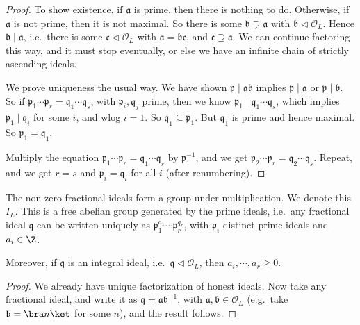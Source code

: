 \documentclass[a4paper]{article}
\begin{document}
\begin{proof}
  To show existence, if $\mathfrak{a}$ is prime, then there is nothing to do. Otherwise, if $\mathfrak{a}$ is not prime, then it is not maximal. So there is some $\mathfrak{b} \supsetneq \mathfrak{a}$ with $\mathfrak{b} \lhd \mathcal{O}_L$. Hence $\mathfrak{b} \mid \mathfrak{a}$, i.e.\ there is some $\mathfrak{c} \lhd \mathcal{O}_L$ with $\mathfrak{a} = \mathfrak{b} \mathfrak{c}$, and $\mathfrak{c} \supseteq \mathfrak{a}$. We can continue factoring this way, and it must stop eventually, or else we have an infinite chain of strictly ascending ideals.

  We prove uniqueness the usual way. We have shown $\mathfrak{p} \mid \mathfrak{a}\mathfrak{b}$ implies $\mathfrak{p} \mid \mathfrak{a}$ or $\mathfrak{p} \mid \mathfrak{b}$. So if $\mathfrak{p}_1 \cdots \mathfrak{p}_r = \mathfrak{q}_1 \cdots \mathfrak{q}_s$, with $\mathfrak{p}_i, \mathfrak{q}_j$ prime, then we know $\mathfrak{p}_1 \mid \mathfrak{q}_1 \cdots \mathfrak{q}_s$, which implies $\mathfrak{p}_1 \mid \mathfrak{q}_i$ for some $i$, and wlog $i = 1$. So $\mathfrak{q}_1 \subseteq \mathfrak{p}_1$. But $\mathfrak{q}_1$ is prime and hence maximal. So $\mathfrak{p}_1 = \mathfrak{q}_1$.

  Multiply the equation $\mathfrak{p}_1 \cdots \mathfrak{p}_r = \mathfrak{q}_1 \cdots \mathfrak{q}_s$ by $\mathfrak{p}_1^{-1}$, and we get $\mathfrak{p}_2 \cdots \mathfrak{p}_r = \mathfrak{q}_2 \cdots \mathfrak{q}_s$. Repeat, and we get $r = s$ and $\mathfrak{p}_i = \mathfrak{q}_i$ for all $i$ (after renumbering).
\end{proof}

\begin{cor}
  The non-zero fractional ideals form a group under multiplication. We denote this $I_L$. This is a free abelian group generated by the prime ideals, i.e.\ any fractional ideal $\mathfrak{q}$ can be written uniquely as $\mathfrak{p}_1^{a_1} \cdots \mathfrak{p}_r^{q_r}$, with $\mathfrak{p}_i$ distinct prime ideals and $a_i \in \Z$.

  Moreover, if $\mathfrak{q}$ is an integral ideal, i.e.\ $\mathfrak{q} \lhd \mathcal{O}_L$, then $a_i, \cdots, a_r \geq 0$.
\end{cor}

\begin{proof}
  We already have unique factorization of honest ideals. Now take any fractional ideal, and write it as $\mathfrak{q} = \mathfrak{a} \mathfrak{b}^{-1}$, with $\mathfrak{a}, \mathfrak{b} \in \mathcal{O}_L$ (e.g.\ take $\mathfrak{b} = \bra n\ket$ for some $n$), and the result follows.
\end{proof}
\end{document}
